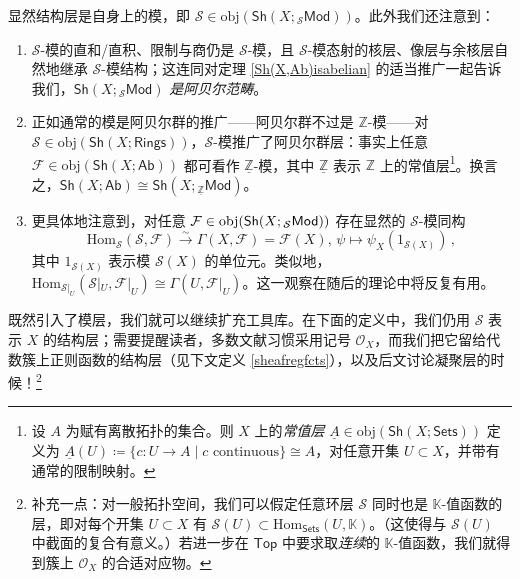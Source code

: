 \begin{Rem}\label{sheafmodulesrem}
显然结构层是自身上的模，即 $\mathcal{S}\in\text{obj}(\mathsf{Sh}(X;{}_\mathcal{S}\mathsf{Mod}))$。此外我们还注意到：
\renewcommand{\theenumi}{\alph{enumi}}
\begin{enumerate}[leftmargin=0.5cm]
	\item $\mathcal{S}$-模的直和/直积、限制与商仍是 $\mathcal{S}$-模，且 $\mathcal{S}$-模态射的核层、像层与余核层自然地继承 $\mathcal{S}$-模结构；这连同对定理 \ref{Sh(X,Ab)isabelian} 的适当推广一起告诉我们，$\mathsf{Sh}(X;{}_\mathcal{S}\mathsf{Mod})$ \textit{是阿贝尔范畴}。
	
	\item 正如通常的模是阿贝尔群的推广——阿贝尔群不过是 $\mathbb{Z}$-模——对 $\mathcal{S}\in\text{obj}(\mathsf{Sh}(X;\mathsf{Rings}))$，$\mathcal{S}$-模推广了阿贝尔群层：事实上任意 $\mathcal{F}\in\text{obj}(\mathsf{Sh}(X;\mathsf{Ab}))$ 都可看作 $\underline{\mathbb{Z}}$-模，其中 $\underline{\mathbb{Z}}$ 表示 $\mathbb{Z}$ 上的常值层\footnote{设 $A$ 为赋有离散拓扑的集合。则 $X$ 上的\textit{常值层} $\underline{A}\in\text{obj}(\mathsf{Sh}(X;\mathsf{Sets}))$ 定义为 $\underline{A}(U)\coloneqq\{c:U\rightarrow A\mid c\text{ continuous}\}\cong A$，对任意开集 $U\subset X$，并带有通常的限制映射。}。换言之，$\mathsf{Sh}(X;\mathsf{Ab})\cong\mathsf{Sh}(X;{}_\mathcal{\underline{\mathbb{Z}}}\mathsf{Mod})$。
	
	\item 更具体地注意到，对任意 $\mathcal{F}\in\textup{obj}(\mathsf{Sh}(X;{}_\mathcal{S}\mathsf{Mod}))$ 存在显然的 $\mathcal{S}$-模同构
	\begin{equation}\label{Homglobalsectiso}
		\text{Hom}_\mathcal{S}(\mathcal{S},\mathcal{F})\xrightarrow{\sim} \Gamma(X,\mathcal{F})=\mathcal{F}(X),\,\psi\mapsto \psi_X(1_{\mathcal{S}(X)})\,,
	\end{equation}
	其中 $1_{\mathcal{S}(X)}$ 表示模 $\mathcal{S}(X)$ 的单位元。类似地，$\text{Hom}_{\mathcal{S}|_U}(\mathcal{S}|_U,\mathcal{F}|_U)\cong \Gamma(U,\mathcal{F}|_U)$。这一观察在随后的理论中将反复有用。
\end{enumerate}
\end{Rem}

既然引入了模层，我们就可以继续扩充工具库。在下面的定义中，我们仍用 $\mathcal{S}$ 表示 $X$ 的结构层；需要提醒读者，多数文献习惯采用记号 $\mathcal{O}_X$，而我们把它留给代数簇上正则函数的结构层（见下文定义 \ref{sheafregfcts}），以及后文讨论凝聚层的时候！\footnote{补充一点：对一般拓扑空间，我们可以假定任意环层 $\mathcal{S}$ 同时也是 $\mathbb{K}$-值函数的层，即对每个开集 $U\subset X$ 有 $\mathcal{S}(U)\subset\text{Hom}_\mathsf{Sets}(U,\mathbb{K})$。（这使得与 $\mathcal{S}(U)$ 中截面的复合有意义。）若进一步在 $\mathsf{Top}$ 中要求取\textit{连续}的 $\mathbb{K}$-值函数，我们就得到簇上 $\mathcal{O}_X$ 的合适对应物。}


